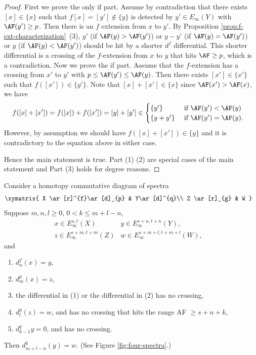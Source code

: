 \begin{proof}
    First we prove the only if part. Assume by contradiction that there exists $[x]\in \{x\}$ such that $f[x]=[y']\notin \{y\}$ is detected by $y'\in E_\infty(Y)$ with $\AF(y')\ge p$. Then there is an $f$ extension from $x$ to $y'$. By Proposition \ref{prop:f-ext-characterization}~(3), $y'$ (if $\AF(y)>\AF(y')$)  or $y-y'$ (if $\AF(y)=\AF(y')$) or $y$ (if $\AF(y)<\AF(y')$) should be hit by a shorter $d^f$ differential. This shorter differential is a crossing of the $f$-extension from $x$ to $y$ that hits $\AF\ge p$, which is a contradiction. Now we prove the if part. Assume that the $f$-extension has a crossing from $x'$ to $y'$ with $p\le \AF(y')\le \AF(y)$. Then there exists $[x']\in \{x'\}$ such that $f([x'])\in \{y'\}$. Note that $[x]+[x']\in \{x\}$ since $\AF(x')>\AF(x)$, we have
    $$f([x]+[x'])=f([x])+f([x'])=[y]+[y']\in\begin{cases}
        \{y'\} & \text{ if } \AF(y')<\AF(y)\\
        \{y+y'\} & \text{ if } \AF(y')=\AF(y).\\
    \end{cases}$$
    However, by assumption we should have $f([x]+[x'])\in \{y\}$ and it is contradictory to the equation above in either case.
    
    Hence the main statement is true.  Part (1) (2) are special cases of the main statement and Part (3) holds for degree reasons.
\end{proof}





\begin{theorem}\label{thm:four-spectra}
    Consider a homotopy commutative diagram of spectra
    $$\xymatrix{
    X \ar[r]^{f}\ar[d]_{p} & Y\ar[d]^{q}\\
    Z \ar[r]_{g} & W
    }$$
    Suppose $m,n,l\ge 0$, $0<k\le m+l-n$,
    $$\begin{array}{ll}
        x\in E^{s,t}_\infty(X) & y\in E^{s+n,t+n}_\infty(Y),\\
        z\in E^{s+m,t+m}_\infty(Z) & w\in E^{s+m+l,t+m+l}_\infty(W),
    \end{array}$$
    and
    \begin{enumerate}
        \item $d^{f}_{n}(x)=y$,
        \item $d^{p}_{m}(x)=z$,
        \item the differential in (1) or the differential in (2) has no crossing,
        \item $d^{g}_{l}(z)=w$, and has no crossing that hits the range AF $\ge s+n+k$,
        \item $d^{q}_{k-1} y=0$, and has no crossing.
    \end{enumerate}
    Then $d^{q}_{m+l-n}(y)=w$. (See Figure \ref{fig:four-spectra}.)
\end{theorem}

